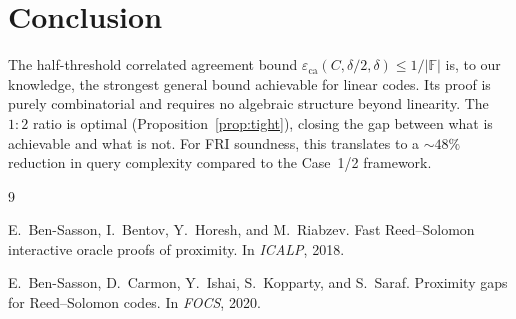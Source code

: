 \documentclass[11pt]{article}
\newcommand{\FF}{\mathbb{F}}
\newcommand{\ca}{\varepsilon_{\mathrm{ca}}}
\begin{document}
\section{Conclusion}

The half-threshold correlated agreement bound
$\ca(C,\delta/2,\delta) \le 1/|\FF|$ is, to our knowledge, the
strongest general bound achievable for linear codes.  Its proof is
purely combinatorial and requires no algebraic structure beyond
linearity.  The $1{:}2$ ratio is optimal (Proposition~\ref{prop:tight}),
closing the gap between what is achievable and what is not.  For FRI
soundness, this translates to a ${\sim}48\%$ reduction in query
complexity compared to the Case~1/2 framework.

\begin{thebibliography}{9}

E.~Ben-Sasson, I.~Bentov, Y.~Horesh, and M.~Riabzev.
\newblock Fast Reed--Solomon interactive oracle proofs of proximity.
\newblock In \emph{ICALP}, 2018.

E.~Ben-Sasson, D.~Carmon, Y.~Ishai, S.~Kopparty, and S.~Saraf.
\newblock Proximity gaps for Reed--Solomon codes.
\newblock In \emph{FOCS}, 2020.

\end{thebibliography}
\end{document}

